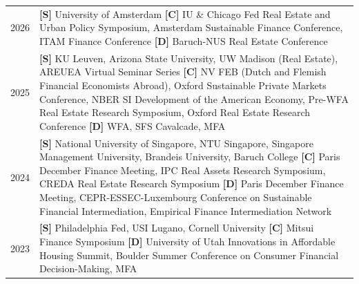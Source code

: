 \documentclass[a4paper]{article}
\begin{document}
\begin{longtable}{p{1.2cm} p{15.5cm}}

2026 & {\bf [S]} University of Amsterdam {\bf [C]} IU \& Chicago Fed Real Estate and Urban Policy Symposium, Amsterdam Sustainable Finance Conference, ITAM Finance Conference {\bf [D]} Baruch-NUS Real Estate Conference \\[0.25cm]

2025 & {\bf [S]} KU Leuven, Arizona State University, UW Madison (Real Estate), AREUEA Virtual Seminar Series {\bf [C]} NV FEB (Dutch and Flemish Financial Economists Abroad), Oxford Sustainable Private Markets Conference, NBER SI Development of the American Economy, Pre-WFA Real Estate Research Symposium, Oxford Real Estate Research Conference {\bf [D]} WFA, SFS Cavalcade, MFA \\[0.25cm] 

2024 & {\bf [S]} National University of Singapore, NTU Singapore, Singapore Management University,  Brandeis University, Baruch College {\bf [C]} Paris December Finance Meeting, IPC Real Assets Research Symposium, CREDA Real Estate Research Symposium {\bf [D]} Paris December Finance Meeting, CEPR-ESSEC-Luxembourg Conference on Sustainable Financial Intermediation, Empirical Finance Intermediation Network \\[0.25cm] 

2023 & {\bf [S]} Philadelphia Fed, USI Lugano, Cornell University {\bf [C]} Mitsui Finance Symposium {\bf [D]} University of Utah Innovations in Affordable Housing Summit, Boulder Summer Conference on Consumer Financial Decision-Making, MFA \\[0.25cm] 

\end{longtable}

\end{document}
